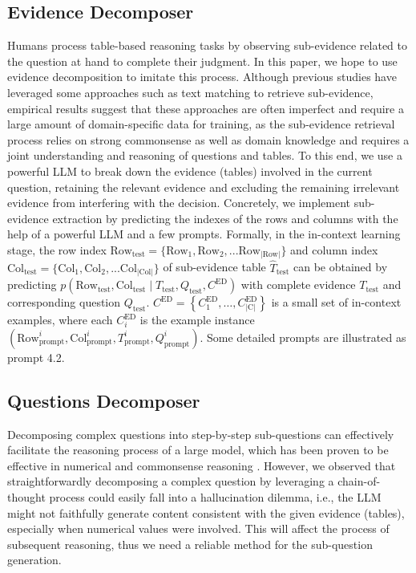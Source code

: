 \subsection{Evidence Decomposer}
Humans process table-based reasoning tasks by observing sub-evidence related to the question at hand to complete their judgment. In this paper, we hope to use evidence decomposition to imitate this process.
Although previous studies have leveraged some approaches \citep{yin2020tabert,tabfact} such as text matching to retrieve sub-evidence, empirical results suggest that these approaches are often imperfect and require a large amount of domain-specific data for training, as the sub-evidence retrieval process relies on strong commonsense as well as domain knowledge and requires a joint understanding and reasoning of questions and tables.
To this end, we use a powerful LLM to break down the evidence (tables) involved in the current question, retaining the relevant evidence and excluding the remaining irrelevant evidence from interfering with the decision. 
Concretely, we implement sub-evidence extraction by predicting the indexes of the rows and columns with the help of a powerful LLM and a few prompts.
Formally, in the in-context learning stage, the row index $\text{Row}_{\text{test}} = \{\text{Row}_1, \text{Row}_2, ... \text{Row}_{|\text{Row}|}\}$ and column index $\text{Col}_{\text{test}} = \{\text{Col}_1, \text{Col}_2, ... \text{Col}_{|\text{Col}|}\}$ of sub-evidence table $\hat{T}_{\text{test}}$ can be obtained by predicting $p(\text{Row}_{\text{test}}, \text{Col}_{\text{test}} \mid T_{\text{test}}, Q_{\text{test}}, C^\text{ED})$ with complete evidence $T_{\text{test}}$ and corresponding question $Q_{\text{test}}$. $C^{\text{ED}}=\left\{C^\text{ED}_1, \ldots, C^\text{ED}_{|\text{C}|}\right\}$ is a small set of in-context examples, where each $C^\text{ED}_i$ is the example instance $(\text{Row}_\text{prompt}^i, \text{Col}_\text{prompt}^i, T_{\text{prompt}}^i, Q_{\text{prompt}}^i)$. Some detailed prompts are illustrated as prompt 4.2.

\subsection{Questions Decomposer}
Decomposing complex questions into step-by-step sub-questions can effectively facilitate the reasoning process of a large model, which has been proven to be effective in numerical and commonsense reasoning \citep{huang2022language,dua2022successive,pot}. However, we observed that 
straightforwardly decomposing a complex question by leveraging a chain-of-thought process could easily fall into a hallucination dilemma, i.e., the LLM might not faithfully generate content consistent with the given evidence (tables), especially when numerical values were involved. This will affect the process of subsequent reasoning, thus we need a reliable method for the sub-question generation.


